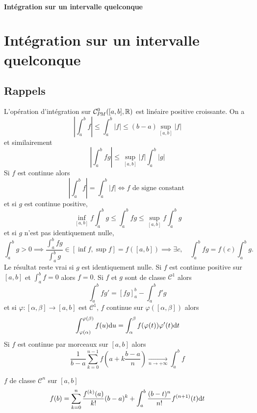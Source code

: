 \ifsolo
    ~

    \vspace{1cm}

    \begin{center}
        \textbf{\LARGE Intégration sur un intervalle quelconque} \\[1em]
    \end{center}
    \tableofcontents
\else
    \chapter{Intégration sur un intervalle quelconque}

    \minitoc
\fi
\thispagestyle{empty}

\ifsolo \newpage \setcounter{page}{1} \fi

\section{Rappels}

L'opération d'intégration sur $\CPM([a, b], \mathbb R)$ est linéaire positive croissante. On a \[
    \left| \int_a^bf \right|\leq \int_a^b|f|\leq (b-a)\sup_{[a,b]} |f|
\]
et similairement \[
    \left| \int_a^bfg \right|\leq \sup_{[a,b]}|f|\int_a^b|g|
\]
Si $f$ est continue alors \[
    \left| \int_a^bf \right|=\int_a^b|f|\iff f\text{ de signe constant }
\]
et si $g$ est continue positive, \[
    \inf_{[a,b]}f\int_a^bg\leq \int_a^bfg\leq \sup_{[a,b]}f\int_a^bg
\]
et si $g$ n'est pas identiquement nulle, \[
    \int_a^bg>0\implies \dfrac{\int_a^bfg}{\int_a^bg}\in[\inf f,\sup f]=f([a,b])\implies \exists c, \quad \int_a^bfg=f(c)\int_a^bg.
\]
Le résultat reste vrai si $g$ est identiquement nulle. Si $f$ est continue positive sur $[a, b]$ et $\int_a^bf=0$ alors $f=0$.
Si $f$ et $g$ sont de classe $\mathcal C^1$ alors \[
    \int_a^bfg'=[fg]_a^b-\int_a^bf'g
\]
et si $\varphi:[\alpha,\beta]\to[a,b]$ est $\mathcal C^1$, $f$ continue sur $\varphi([\alpha,\beta])$ alors \[
    \int_{\varphi(\alpha)}^{\varphi(\beta)}f(u)\mathrm{d} u=\int_\alpha^\beta f(\varphi(t))\varphi'(t)\mathrm{d} t
\]
Si $f$ est continue par morceaux sur $[a, b]$ alors \[
    \frac1{b-a}\sum_{k=0}^{n-1}f \left( a+k\frac{b-a}n \right)\xrightarrow[n\to+\infty]{}\int_a^bf
\]

\begin{thm}
    \Hyp $f$ de classe $\mathcal C^n$ sur $[a, b]$
    \Conc \[
        f(b)=\sum_{k=0}^n\frac{f^{(k)}(a)}{k!}(b-a)^k+\int_a^b\frac{(b-t)^n}{n!}f^{(n+1)}(t)\mathrm{d} t
    \]
\end{thm}

